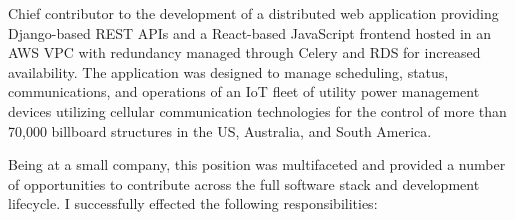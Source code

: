 \documentclass[10pt,a4paper]{article}
\begin{document}
Chief contributor to the development of a distributed web application providing
Django-based REST APIs and a React-based JavaScript frontend hosted in an
AWS VPC with redundancy managed through Celery and RDS for increased availability. The
application was designed to manage scheduling, status, communications, and operations
of an IoT fleet of utility power management devices utilizing cellular communication
technologies for the control of more than 70,000 billboard structures in the US,
Australia, and South America.

Being at a small company, this position was multifaceted and provided a number of
opportunities to contribute across the full software stack and development lifecycle.
I successfully effected the following responsibilities:
\end{document}

